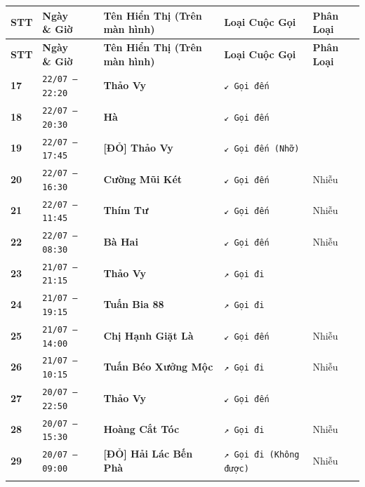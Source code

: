\documentclass[12pt,a4paper]{article}
\begin{document}
\vspace{0.2cm}
\begingroup
\small
\begin{xltabular}{\textwidth}{>{\hsize}X >{\hsize}X >{\hsize}X >{\hsize}X >{\hsize}X}
\toprule
\textbf{STT} & \textbf{Ngày \newline \& Giờ} & \textbf{Tên Hiển Thị (Trên màn hình)} & \textbf{Loại Cuộc Gọi} & \textbf{Phân Loại} \\
\midrule
\endfirsthead
\toprule
\textbf{STT} & \textbf{Ngày \newline \& Giờ} & \textbf{Tên Hiển Thị (Trên màn hình)} & \textbf{Loại Cuộc Gọi} & \textbf{Phân Loại} \\
\midrule
\endhead
\bottomrule
\endfoot
\textbf{17} & \texttt{22/07 — 22:20} & \textbf{Thảo Vy} & \texttt{↙ Gọi đến} &  \\ \addlinespace[4pt]
\textbf{18} & \texttt{22/07 — 20:30} & \textbf{Hà} & \texttt{↙ Gọi đến} &  \\ \addlinespace[4pt]
\textbf{19} & \texttt{22/07 — 17:45} &  \textbf{[ĐỎ] Thảo Vy} & \texttt{↙ Gọi đến (Nhỡ)} &  \\ \addlinespace[4pt]
\textbf{20} & \texttt{22/07 — 16:30} & \textbf{Cường Mũi Két} & \texttt{↙ Gọi đến} & Nhiễu \\ \addlinespace[4pt]
\textbf{21} & \texttt{22/07 — 11:45} & \textbf{Thím Tư} & \texttt{↙ Gọi đến} & Nhiễu \\ \addlinespace[4pt]
\textbf{22} & \texttt{22/07 — 08:30} & \textbf{Bà Hai} & \texttt{↙ Gọi đến} & Nhiễu \\ \addlinespace[4pt]
\textbf{23} & \texttt{21/07 — 21:15} & \textbf{Thảo Vy} & \texttt{↗ Gọi đi} &  \\ \addlinespace[4pt]
\textbf{24} & \texttt{21/07 — 19:15} & \textbf{Tuấn Bia 88} & \texttt{↗ Gọi đi} &  \\ \addlinespace[4pt]
\textbf{25} & \texttt{21/07 — 14:00} & \textbf{Chị Hạnh Giặt Là} & \texttt{↙ Gọi đến} & Nhiễu \\ \addlinespace[4pt]
\textbf{26} & \texttt{21/07 — 10:15} & \textbf{Tuấn Béo Xưởng Mộc} & \texttt{↗ Gọi đi} & Nhiễu \\ \addlinespace[4pt]
\textbf{27} & \texttt{20/07 — 22:50} & \textbf{Thảo Vy} & \texttt{↙ Gọi đến} &  \\ \addlinespace[4pt]
\textbf{28} & \texttt{20/07 — 15:30} & \textbf{Hoàng Cắt Tóc} & \texttt{↗ Gọi đi} & Nhiễu \\ \addlinespace[4pt]
\textbf{29} & \texttt{20/07 — 09:00} &  \textbf{[ĐỎ] Hải Lác Bến Phà} & \texttt{↗ Gọi đi (Không được)} & Nhiễu \\ \addlinespace[4pt]

\end{xltabular}
\end{document}
